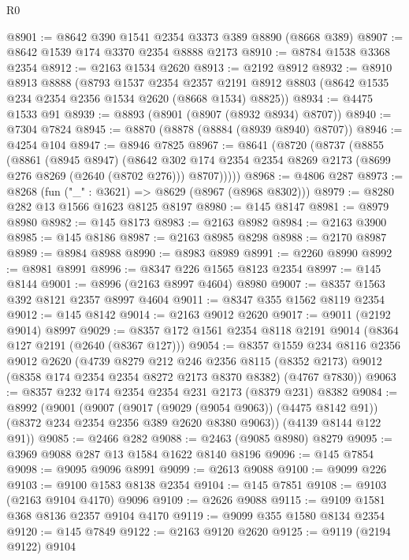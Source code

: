 \begin{lexlean}{R0}
\begin{coremodule}
@8901 := @8642 @390 @1541 @2354 @3373 @389 @8890 (@8668 @389)
@8907 := @8642 @1539 @174 @3370 @2354 @8888 @2173
@8910 := @8784 @1538 @3368 @2354
@8912 := @2163 @1534 @2620
@8913 := @2192 @8912
@8932 := @8910
    @8913
    @8888
    (@8793
      @1537
      @2354
      @2357
      @2191
      @8912
      @8803
      (@8642 @1535 @234 @2354 @2356 @1534 @2620 (@8668 @1534) @8825))
@8934 := @4475 @1533 @91
@8939 := @8893 (@8901 (@8907 (@8932 @8934) @8707))
@8940 := @7304 @7824
@8945 := @8870 (@8878 (@8884 (@8939 @8940) @8707))
@8946 := @4254 @104
@8947 := @8946 @7825
@8967 := @8641
    (@8720
      (@8737
        (@8855
          (@8861
            (@8945 @8947)
            (@8642
              @302
              @174
              @2354
              @2354
              @8269
              @2173
              (@8699 @276 @8269 (@2640 (@8702 @276)))
              @8707)))))
@8968 := @4806 @287
@8973 := @8268 (fun ("_" : @3621) => @8629 (@8967 (@8968 @8302)))
@8979 := @8280 @282 @13 @1566 @1623 @8125 @8197
@8980 := @145 @8147
@8981 := @8979 @8980
@8982 := @145 @8173
@8983 := @2163 @8982
@8984 := @2163 @3900
@8985 := @145 @8186
@8987 := @2163 @8985 @8298
@8988 := @2170 @8987
@8989 := @8984 @8988
@8990 := @8983 @8989
@8991 := @2260 @8990
@8992 := @8981 @8991
@8996 := @8347 @226 @1565 @8123 @2354
@8997 := @145 @8144
@9001 := @8996 (@2163 @8997 @4604) @8980
@9007 := @8357 @1563 @392 @8121 @2357 @8997 @4604
@9011 := @8347 @355 @1562 @8119 @2354
@9012 := @145 @8142
@9014 := @2163 @9012 @2620
@9017 := @9011 (@2192 @9014) @8997
@9029 := @8357 @172 @1561 @2354 @8118 @2191 @9014 (@8364 @127 @2191 (@2640 (@8367 @127)))
@9054 := @8357
    @1559
    @234
    @8116
    @2356
    @9012
    @2620
    (@4739
      @8279
      @212
      @246
      @2356
      @8115
      (@8352 @2173)
      @9012
      (@8358 @174 @2354 @2354 @8272 @2173 @8370 @8382)
      (@4767 @7830))
@9063 := @8357 @232 @174 @2354 @2354 @231 @2173 (@8379 @231) @8382
@9084 := @8992
    (@9001
      (@9007
        (@9017 (@9029 (@9054 @9063)) (@4475 @8142 @91))
        (@8372 @234 @2354 @2356 @389 @2620 @8380 @9063))
      (@4139 @8144 @122 @91))
@9085 := @2466 @282
@9088 := @2463 (@9085 @8980) @8279
@9095 := @3969 @9088 @287 @13 @1584 @1622 @8140 @8196
@9096 := @145 @7854
@9098 := @9095 @9096 @8991
@9099 := @2613 @9088
@9100 := @9099 @226
@9103 := @9100 @1583 @8138 @2354
@9104 := @145 @7851
@9108 := @9103 (@2163 @9104 @4170) @9096
@9109 := @2626 @9088
@9115 := @9109 @1581 @368 @8136 @2357 @9104 @4170
@9119 := @9099 @355 @1580 @8134 @2354
@9120 := @145 @7849
@9122 := @2163 @9120 @2620
@9125 := @9119 (@2194 @9122) @9104

\end{coremodule}
\end{lexlean}
